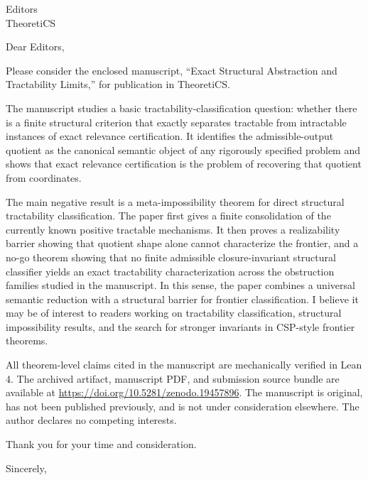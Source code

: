 \documentclass[11pt]{letter}
\date{April 14, 2026}
\begin{document}
\begin{letter}{Editors\\TheoretiCS}

\opening{Dear Editors,}

Please consider the enclosed manuscript, ``Exact Structural Abstraction and Tractability Limits,'' for publication in TheoretiCS.

The manuscript studies a basic tractability-classification question: whether there is a finite structural criterion that exactly separates tractable from intractable instances of exact relevance certification. It identifies the admissible-output quotient as the canonical semantic object of any rigorously specified problem and shows that exact relevance certification is the problem of recovering that quotient from coordinates.

The main negative result is a meta-impossibility theorem for direct structural tractability classification. The paper first gives a finite consolidation of the currently known positive tractable mechanisms. It then proves a realizability barrier showing that quotient shape alone cannot characterize the frontier, and a no-go theorem showing that no finite admissible closure-invariant structural classifier yields an exact tractability characterization across the obstruction families studied in the manuscript. In this sense, the paper combines a universal semantic reduction with a structural barrier for frontier classification. I believe it may be of interest to readers working on tractability classification, structural impossibility results, and the search for stronger invariants in CSP-style frontier theorems.

All theorem-level claims cited in the manuscript are mechanically verified in Lean 4. The archived artifact, manuscript PDF, and submission source bundle are available at \url{https://doi.org/10.5281/zenodo.19457896}. The manuscript is original, has not been published previously, and is not under consideration elsewhere. The author declares no competing interests.

Thank you for your time and consideration.

\closing{Sincerely,}

\end{letter}
\end{document}
